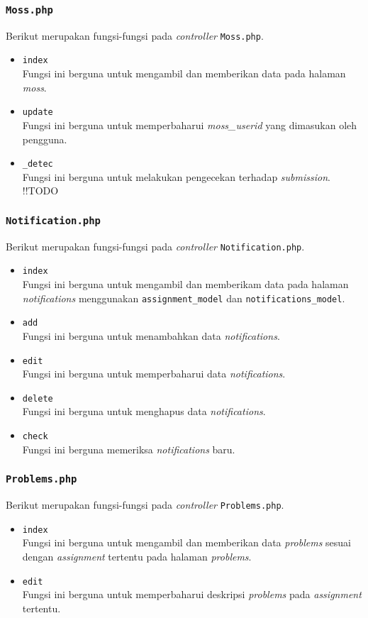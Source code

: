 \subsubsection{\texttt{Moss.php}}
Berikut merupakan fungsi-fungsi pada \textit{controller} \texttt{Moss.php}.
\begin{itemize}
	\item \texttt{index}\\
	Fungsi ini berguna untuk mengambil dan memberikan data pada halaman \textit{moss}.
	\item \texttt{update}\\
	Fungsi ini berguna untuk memperbaharui \textit{moss\_userid} yang dimasukan oleh pengguna.
	\item \texttt{\_detec}\\
	Fungsi ini berguna untuk melakukan pengecekan terhadap \textit{submission}. !!TODO
\end{itemize}
\subsubsection{\texttt{Notification.php}}
Berikut merupakan fungsi-fungsi pada \textit{controller} \texttt{Notification.php}.
\begin{itemize}
	\item \texttt{index}\\
	Fungsi ini berguna untuk mengambil dan memberikam data pada halaman \textit{notifications} menggunakan \texttt{assignment\_model} dan \texttt{notifications\_model}.
	\item \texttt{add}\\
	Fungsi ini berguna untuk menambahkan data \textit{notifications}.
	\item \texttt{edit}\\
	Fungsi ini berguna untuk memperbaharui data \textit{notifications}.
	\item \texttt{delete}\\
	Fungsi ini berguna untuk menghapus data \textit{notifications}.
	\item \texttt{check}\\
	Fungsi ini berguna memeriksa \textit{notifications} baru.
\end{itemize}
\subsubsection{\texttt{Problems.php}}
Berikut merupakan fungsi-fungsi pada \textit{controller} \texttt{Problems.php}.
\begin{itemize}
	\item \texttt{index}\\
	Fungsi ini berguna untuk mengambil dan memberikan data \textit{problems} sesuai dengan \textit{assignment} tertentu pada halaman \textit{problems}.
	\item \texttt{edit}\\
	Fungsi ini berguna untuk memperbaharui deskripsi \textit{problems} pada \textit{assignment} tertentu.
\end{itemize}
